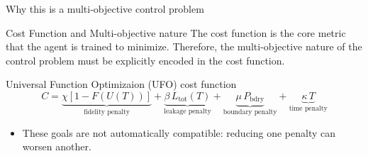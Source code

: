 \documentclass{beamer}
\begin{document}
\begin{frame}{Why this is a multi-objective control problem}
\small
\begin{alertblock}{Cost Function and Multi-objective nature}
    The cost function is the core metric that the agent is trained to minimize.
    Therefore, the multi-objective nature of the control problem must be explicitly encoded in the cost function.
\end{alertblock}


\begin{block}{Universal Function Optimizaion (UFO) cost function}
    \[
C=
\underbrace{\chi\!\left[1-F(U(T))\right]}_{\text{fidelity penalty}}
+\underbrace{\beta\,L_{\mathrm{tot}}(T)}_{\text{leakage penalty}}
+\underbrace{\mu\,P_{\mathrm{bdry}}}_{\text{boundary penalty}}
+\underbrace{\kappa\,T}_{\text{time penalty}}
\]
\end{block}

\vspace{0.2em}


\begin{itemize}\itemsep0.2em
    \item These goals are not automatically compatible: reducing one penalty can worsen another.
\end{itemize}



\let\thefootnote\relax{}
\end{frame}
\end{document}
